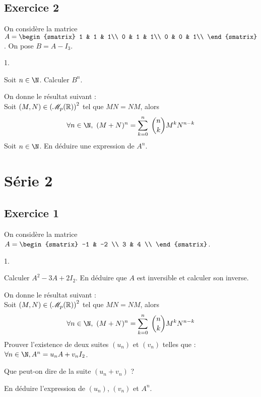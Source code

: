 \documentclass[11pt]{article}%
\begin{document}
\subsection*{Exercice 2}
\noindent
On considère la matrice $A = 
      \begin{smatrix}
        1 & 1 & 1\\
        0 & 1 & 1\\
        0 & 0 & 1\\
      \end{smatrix}$. On pose $B = A - I_3$.
      \begin{noliste}{1.}
       \item Soit $n\in\N$. Calculer $B^n$.
       \item On donne le résultat suivant :\\
    Soit $(M,N)\in\left(\mathscr{M}_{p}(\mathbb{R})\right)^2$ tel que $MN=NM$, alors
    \[
     \forall n \in\N, \ (M+N)^n = \DSum{k=0}{n} \dbinom{n}{k} 
     M^k N^{n-k}
    \]
    Soit $n\in\N$. En déduire une expression de $A^n$.
      \end{noliste}

\newpage

\section{Série 2}

\subsection*{Exercice 1}
\noindent
On considère la matrice $A =
      \begin{smatrix}
        -1 & -2 \\
        3 & 4 \\
      \end{smatrix}$.
    \begin{noliste}{1.}
    \item Calculer $A^2 - 3A + 2I_2$. En déduire que $A$ est
      inversible et calculer son inverse.  
    \item On donne le résultat suivant :\\
    Soit $(M,N)\in\left(\mathscr{M}_{p}(\mathbb{R})\right)^2$ tel que $MN=NM$, alors
    \[
     \forall n \in\N, \ (M+N)^n = \DSum{k=0}{n} \dbinom{n}{k} 
     M^k N^{n-k}
    \]
    Prouver l'existence de deux suites $(u_n)$ et $(v_n)$ telles
      que : $\forall n \in \N, A^n = u_n A + v_n I_2$.
    \item Que peut-on dire de la suite $(u_n+v_n)$ ?
    \item En déduire l'expression de $(u_n)$, $(v_n)$ et $A^n$.
    \end{noliste}
\end{document}

